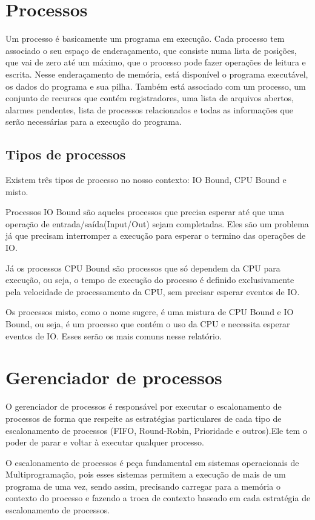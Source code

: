 \documentclass[times, 10pt,twocolumn]{article}
\begin{document}
\section{Processos}
    Um processo é basicamente um programa em execução. Cada processo tem associado o seu espaço de enderaçamento, que consiste numa lista de posições, que vai de zero até um máximo, que o processo pode fazer operações de leitura e escrita. Nesse enderaçamento de memória, está disponível o programa executável, os dados do programa e sua pilha. Também está associado com um processo, um conjunto de recursos que contém registradores, uma lista de arquivos abertos, alarmes pendentes, lista de processos relacionados e todas as informações que serão necessárias para a execução do programa.\cite{tanenbaum}
\subsection{Tipos de processos}
    Existem três tipos de processo no nosso contexto: IO Bound, CPU Bound e misto.
    
    Processos IO Bound são aqueles processos que precisa esperar até que uma operação de entrada/saída(Input/Out) sejam completadas. Eles são um problema já que precisam interromper a execução para esperar o termino das operações de IO.
    
    Já os processos CPU Bound são processos que só dependem da CPU para execução, ou seja, o tempo de execução do processo é definido exclusivamente pela velocidade de processamento da CPU, sem precisar esperar eventos de IO.
    
    Os processos misto, como o nome sugere, é uma mistura de CPU Bound e IO Bound, ou seja, é um processo que contém o uso da CPU e necessita esperar eventos de IO. Esses serão os mais comuns nesse relatório.
    
\section{Gerenciador de processos} \label{sec_escalonamento}
    O gerenciador de processos é responsável por executar o escalonamento de processos de forma que respeite as estratégias particulares de cada tipo de escalonamento de processos (FIFO, Round-Robin, Prioridade e outros).\cite{tutorialspoint}Ele tem o poder de parar e voltar à executar qualquer processo.
    
    O escalonamento de processos é peça fundamental em sistemas operacionais de Multiprogramação, pois esses sistemas permitem a execução de mais de um programa de uma vez, sendo assim, precisando carregar para a memória o contexto do processo e fazendo a troca de contexto baseado em cada estratégia de escalonamento de processos.
    
\end{document}

